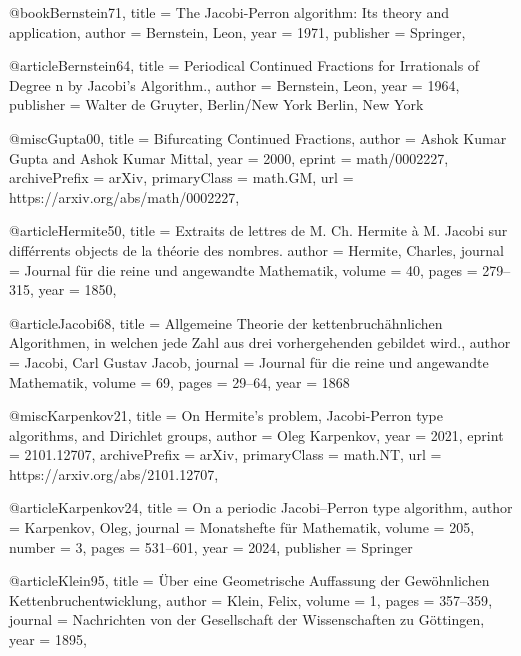 \documentclass[english,version-2020-11]{uzl-thesis}
\begin{document}








\begin{bibtex-entries}
@book{Bernstein71,
  title     = {The Jacobi-Perron algorithm: Its theory and application},
  author    = {Bernstein, Leon},
  year      = {1971},
  publisher = {Springer},
}

@article{Bernstein64,
  title     = {Periodical Continued Fractions for Irrationals of Degree n by Jacobi's Algorithm.},
  author    = {Bernstein, Leon},
  year      = {1964},
  publisher = {Walter de Gruyter, Berlin/New York Berlin, New York}
}

@misc{Gupta00,
  title         = {Bifurcating Continued Fractions},
  author        = {Ashok Kumar Gupta and Ashok Kumar Mittal},
  year          = {2000},
  eprint        = {math/0002227},
  archivePrefix = {arXiv},
  primaryClass  = {math.GM},
  url           = {https://arxiv.org/abs/math/0002227},
}

@article{Hermite50,
  title   = {Extraits de lettres de M. Ch. Hermite {\`a} M. Jacobi sur diff{\'e}rrents objects de la th{\'e}orie des nombres.}
  author  = {Hermite, Charles},
  journal = {Journal f{\"u}r die reine und angewandte Mathematik},
  volume  = {40},
  pages   = {279--315},
  year    = {1850},
}

@article{Jacobi68,
  title   = {Allgemeine Theorie der kettenbruch{\"a}hnlichen Algorithmen, in welchen jede Zahl aus drei vorhergehenden gebildet wird.},
  author  = {Jacobi, Carl Gustav Jacob},
  journal = {Journal f{\"u}r die reine und angewandte Mathematik},
  volume  = {69},
  pages   = {29--64},
  year    = {1868}
}

@misc{Karpenkov21,
  title         = {On Hermite's problem, Jacobi-Perron type algorithms, and Dirichlet groups},
  author        = {Oleg Karpenkov},
  year          = {2021},
  eprint        = {2101.12707},
  archivePrefix = {arXiv},
  primaryClass  = {math.NT},
  url           = {https://arxiv.org/abs/2101.12707},
}

@article{Karpenkov24,
  title     = {On a periodic Jacobi--Perron type algorithm},
  author    = {Karpenkov, Oleg},
  journal   = {Monatshefte f{\"u}r Mathematik},
  volume    = {205},
  number    = {3},
  pages     = {531--601},
  year      = {2024},
  publisher = {Springer}
}

@article{Klein95,
  title   = {Über eine Geometrische Auffassung der Gewöhnlichen Kettenbruchentwicklung},
  author  = {Klein, Felix},
  volume  = {1},
  pages   = {357--359},
  journal = {Nachrichten von der Gesellschaft der Wissenschaften zu Göttingen},
  year    = {1895},
}


\end{bibtex-entries}
\end{document}
